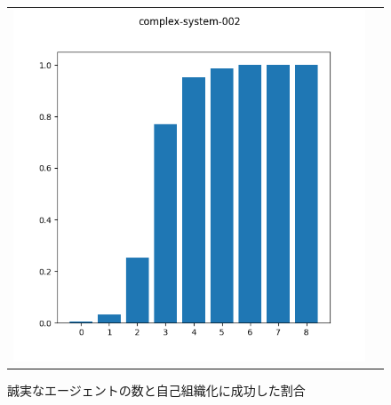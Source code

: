 \begin{figure}[h]
  \begin{tabular}{cc}
    \begin{minipage}[t]{1\hsize}
      \centering
      \includegraphics[keepaspectratio, width=1\linewidth]{./07_complex-system/complex-system-002.png}
      \caption{誠実なエージェントの数と自己組織化に成功した割合}
      \label{compex-system-002}
    \end{minipage}
  \end{tabular}
\end{figure}
